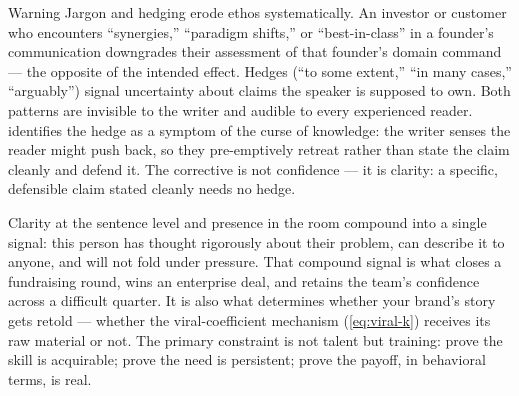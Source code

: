 \begin{admonition}{Warning}
Jargon and hedging erode ethos systematically. An investor or customer who encounters
``synergies,'' ``paradigm shifts,'' or ``best-in-class'' in a founder's communication
downgrades their assessment of that founder's domain command — the opposite of the
intended effect. Hedges (``to some extent,'' ``in many cases,'' ``arguably'') signal
uncertainty about claims the speaker is supposed to own. Both patterns are invisible to
the writer and audible to every experienced reader. \textcite{pinker2014senseofstyle}
identifies the hedge as a symptom of the curse of knowledge: the writer senses the reader
might push back, so they pre-emptively retreat rather than state the claim cleanly and
defend it. The corrective is not confidence — it is clarity: a specific, defensible
claim stated cleanly needs no hedge.
\end{admonition}

Clarity at the sentence level and presence in the room compound into a single signal: this
person has thought rigorously about their problem, can describe it to anyone, and will not
fold under pressure. That compound signal is what closes a fundraising round, wins an
enterprise deal, and retains the team's confidence across a difficult quarter. It is also
what determines whether your brand's story gets retold — whether the viral-coefficient
mechanism (\cref{eq:viral-k}) receives its raw material or not. The primary constraint is
not talent but training: \textcite{lacerenza2017training} prove the skill is acquirable;
\textcite{camerer1989curse} prove the need is persistent; \textcite{braddock2016narrative}
prove the payoff, in behavioral terms, is real.
